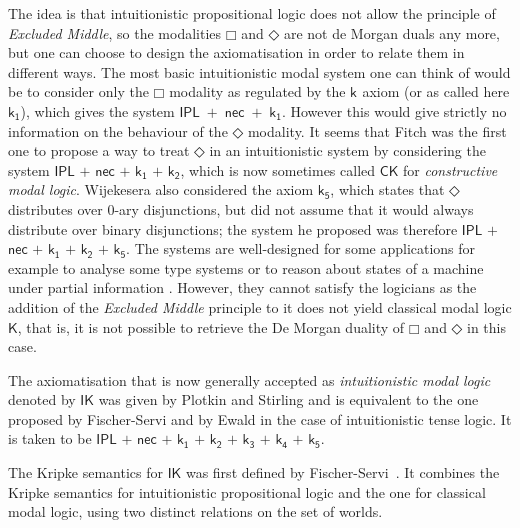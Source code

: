 \documentclass[a4paper]{article}
\theoremstyle{plain}
\theoremstyle{definition}
\newcommand*{\ax}[1]{\mathsf{#1}}
\newcommand*{\kax}[1][]		{\ax{k_{#1}}}
\newcommand*{\IK}{\mathsf{IK}}
\newcommand*{\K}{\mathsf{K}}
\newcommand*{\BOX}{\mathord{\Box}}
\newcommand*{\DIA}{\mathord{\Diamond}}
\newcommand*{\rn}[1]  {\ensuremath{\mathsf{#1}}}
\begin{document}
The idea is that intuitionistic propositional logic does not allow the principle of \emph{Excluded Middle}, so the modalities $\BOX$ and $\DIA$ are not de Morgan duals any more, but one can choose to design the axiomatisation in order to relate them in different ways. The most basic intuitionistic modal system one can think of would be to consider only the $\BOX$ modality as regulated by the $\kax$ axiom (or as called here $\kax[1]$), which gives the system \hbox{$\rn{IPL}$ $\rn{+}$ $\rn{nec}$ $\rn{+}$ $\kax[1]$}. However this would give strictly no information on the behaviour of the $\DIA$ modality.
It seems that Fitch \cite{fitch:pm48} was the first one to propose a way to treat $\DIA$ in an intuitionistic system by considering the system  $\rn{IPL}$ $\rn{+}$ $\rn{nec}$ $\rn{+}$ $\kax[1]$ $\rn{+}$ $\kax[2]$, which is now sometimes called $\rn{CK}$ for \emph{constructive modal logic}. Wijekesera \cite{wijesekera:apal90} also considered the axiom $\kax[5]$, which states that $\DIA$ distributes over 0-ary disjunctions, but did not assume that it would always distribute over binary disjunctions; the system he proposed was therefore  $\rn{IPL}$ $\rn{+}$ $\rn{nec}$ $\rn{+}$ $\kax[1]$ $\rn{+}$ $\kax[2]$  $\rn{+}$ $\kax[5]$. The systems are well-designed for some applications for example to analyse some type systems \cite{benton:etal:jfp98} or to reason about states of a machine under partial information \cite{wijesekera:nerode:apal05}. However, they cannot satisfy the logicians as the addition of the \emph{Excluded Middle} principle to it does not yield classical modal logic $\K$, that is, it is not possible to retrieve the De Morgan duality of $\BOX$ and $\DIA$ in this case.

The axiomatisation that is now generally accepted as \emph{intuitionistic modal logic} denoted by $\IK$ was given by Plotkin and Stirling \cite{plotkin:stirling:86} and is equivalent to the one proposed by Fischer-Servi \cite{fischer-servi:84} and by Ewald \cite{ewald:jsl86} in the case of intuitionistic tense logic. It is taken to be    $\rn{IPL}$ $\rn{+}$ $\rn{nec}$ $\rn{+}$ $\kax[1]$ $\rn{+}$ $\kax[2]$ $\rn{+}$ $\kax[3]$ $\rn{+}$ $\kax[4]$  $\rn{+}$ $\kax[5]$.


The Kripke semantics for $\IK$ was first defined by Fischer-Servi~\cite{fischer-servi:84}.
%
It combines the Kripke semantics for intuitionistic propositional logic and the one for classical modal logic, using two distinct relations on the set of worlds.
\end{document}
